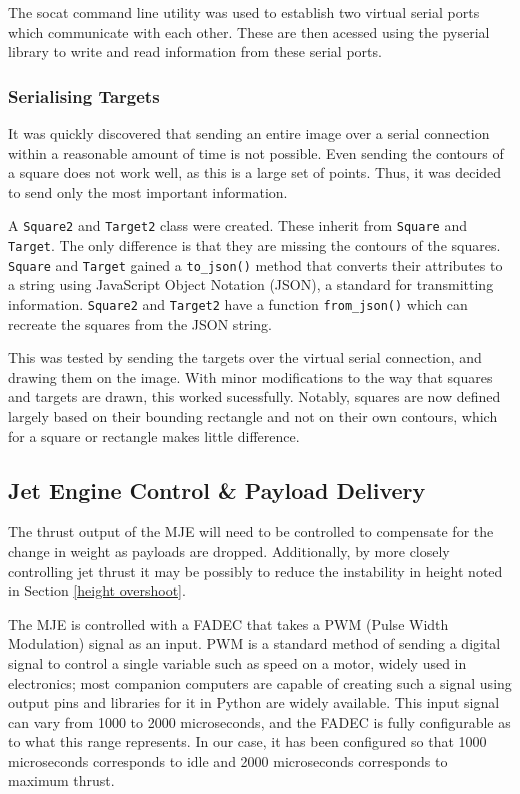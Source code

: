 \documentclass[11pt]{article}
\begin{document}
The socat command line utility was used to establish two virtual serial ports which communicate with each other. These are then acessed using the pyserial library to write and read information from these serial ports.

\subsubsection{Serialising Targets}
It was quickly discovered that sending an entire image over a serial connection within a reasonable amount of time is not possible. Even sending the contours of a square does not work well, as this is a large set of points. Thus, it was decided to send only the most important information.

A \lstinline|Square2| and \lstinline|Target2| class were created. These inherit from \lstinline|Square| and \lstinline|Target|. The only difference is that they are missing the contours of the squares. \lstinline|Square| and \lstinline|Target| gained a \lstinline|to_json()| method that converts their attributes to a string using JavaScript Object Notation (JSON), a standard for transmitting information. \lstinline|Square2| and \lstinline|Target2| have a function \lstinline|from_json()| which can recreate the squares from the JSON string.

This was tested by sending the targets over the virtual serial connection, and drawing them on the image. With minor modifications to the way that squares and targets are drawn, this worked sucessfully. Notably, squares are now defined largely based on their bounding rectangle and not on their own contours, which for a square or rectangle makes little difference.

\subsection{Jet Engine Control \& Payload Delivery}
The thrust output of the MJE will need to be controlled to compensate for the change in weight as payloads are dropped. Additionally, by more closely controlling jet thrust it may be possibly to reduce the instability in height noted in Section \ref{height overshoot}.

The MJE is controlled with a FADEC that takes a PWM (Pulse Width Modulation) signal as an input. PWM is a standard method of sending a digital signal to control a single variable such as speed on a motor, widely used in electronics; most companion computers are capable of creating such a signal using output pins and libraries for it in Python are widely available. This input signal can vary from 1000 to 2000 microseconds, and the FADEC is fully configurable as to what this range represents. In our case, it has been configured so that 1000 microseconds corresponds to idle and 2000 microseconds corresponds to maximum thrust.
\end{document}
